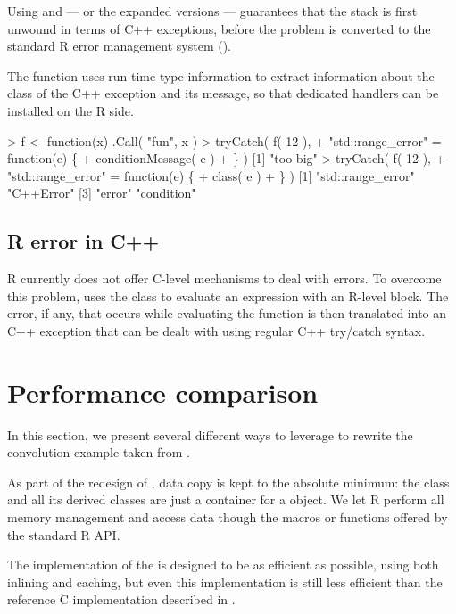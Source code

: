 Using  and  --- or the expanded versions ---
guarantees that the stack is first unwound in terms of C++ exceptions, before 
the problem is converted to the standard R error management system ().

The  function uses run-time type information to 
extract information about the class of the C++ exception and its message, so that 
dedicated handlers can be installed on the R side. 

\begin{example}
> f <- function(x) .Call( "fun", x )
> tryCatch( f( 12 ), 
+    "std::range_error" = function(e) \{
+       conditionMessage( e )
+    \} )
[1] "too big"
> tryCatch( f( 12 ), 
+    "std::range_error" = function(e) \{
+       class( e )
+    \} )
[1] "std::range_error" "C++Error"
[3] "error"            "condition" 
\end{example}

\subsection{R error in C++}

R currently does not offer C-level mechanisms to deal with errors. To 
overcome this problem,  uses the 
class to evaluate an expression with an R-level 
block. The error, if any, that occurs while evaluating the 
function is then translated into an C++ exception that can be dealt with using 
regular C++ try/catch syntax.

\section{Performance comparison}

In this section, we present several different ways to leverage  to 
rewrite the convolution example taken from \cite{R:exts}. 

As part of the redesign of , data copy is kept to the
absolute minimum: the  class and all its derived
classes are just a container for a  object. We let R perform
all memory management and access data though the macros or functions
offered by the standard R API. 

The implementation of the  is designed to be as 
efficient as possible, using both inlining and caching, 
but even this implementation is still less efficient than the 
reference C implementation described in \cite{R:exts}. 


